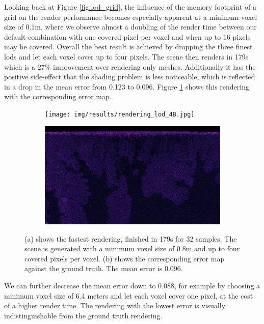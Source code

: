 Looking back at Figure \ref{fig:lod_grid}, the influence of the memory footprint of a grid on the render performance becomes especially apparent at a minimum voxel size of 0.1m, where we observe almost a doubling of the render time between our default combination with one covered pixel per voxel and when up to 16 pixels may be covered.
Overall the best result is achieved by dropping the three finest \acsp{lod} and let each voxel cover up to four pixels.
The scene then renders in 179s which is a 27\% improvement over rendering only meshes.
Additionally it has the positive side-effect that the shading problem is less noticeable, which is reflected in a drop in the mean \FLIP error from 0.123 to 0.096.
Figure \ref{fig:render_and_error_fastest} shows this rendering with the corresponding \FLIP error map.
\begin{figure}[ht]
    \centering
    \begin{subfigure}[b]{0.9\linewidth}
        \centering
        \texttt{[image: img/results/rendering\_lod\_4B.jpg]}
        \caption{}
    \end{subfigure}
    \begin{subfigure}[b]{0.9\linewidth}
        \centering
        \includegraphics[width=1\linewidth]{img/results/flip_error_4B.jpg}
        \caption{}
    \end{subfigure}
	\caption[Rendering and \FLIP error map of the fastest combination]{(a) shows the fastest rendering, finished in 179s for 32 samples. The scene is generated with a minimum voxel size of 0.8m and up to four covered pixels per voxel. (b) shows the corresponding \FLIP error map against the ground truth. The mean \FLIP error is 0.096.}
	\label{fig:render_and_error_fastest}
\end{figure}
We can further decrease the mean \FLIP error down to 0.088, for example by choosing a minimum voxel size of 6.4 meters and let each voxel cover one pixel, at the cost of a higher render time.
The rendering with the lowest \FLIP error is visually indistinguishable from the ground truth rendering.




